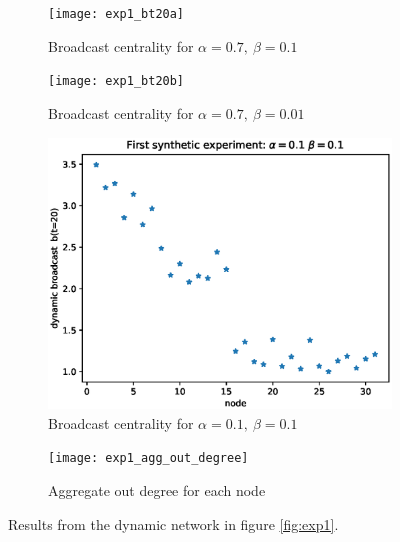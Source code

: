 \begin{figure}
     \centering
     \begin{subfigure}[b]{0.4\textwidth}
         \centering
         \texttt{[image: exp1\_bt20a]}
         \caption{Broadcast centrality for $\alpha = 0.7 ,~\beta = 0.1$}
         \label{fig:bt1}
     \end{subfigure}
     \hspace{0.5cm}
     \begin{subfigure}[b]{0.4\textwidth}
         \centering
         \texttt{[image: exp1\_bt20b]}
         \caption{Broadcast centrality for $\alpha = 0.7 ,~\beta = 0.01$}
         \label{fig:bt2}
     \end{subfigure}
     
     \begin{subfigure}[b]{0.4\textwidth}
         \centering
         \includegraphics[width=\textwidth]{exp1_bt20c}
         \caption{Broadcast centrality for $\alpha = 0.1 ,~\beta = 0.1$}
         \label{fig:bt3}
     \end{subfigure}
     \hspace{0.5cm}
     \begin{subfigure}[b]{0.4\textwidth}
         \centering
         \texttt{[image: exp1\_agg\_out\_degree]}
         \caption{Aggregate out degree for each node}
         \label{fig:bt4}
     \end{subfigure}
        \caption{Results from the dynamic network in figure \ref{fig:exp1}.}
        \label{fig:fourbt}
\end{figure}

